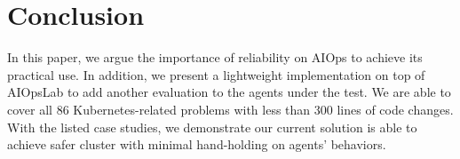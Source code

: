 \section{Conclusion}

In this paper, we argue the importance of reliability on AIOps to achieve its practical use. In addition, we present a lightweight implementation on top of AIOpsLab to add another evaluation to the agents under the test. We are able to cover all 86 Kubernetes-related problems with less than 300 lines of code changes. With the listed case studies, we demonstrate our current solution is able to achieve safer cluster with minimal hand-holding on agents' behaviors.